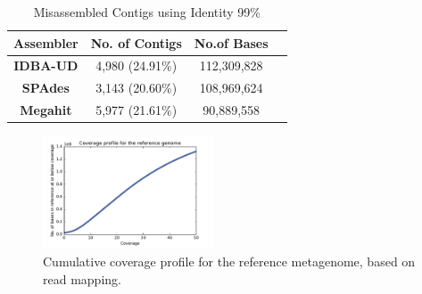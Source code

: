\documentclass[10pt,a4paper,twocolumn]{article}
\begin{document}




\begin{table}[t]
\caption{Misassembled Contigs using Identity 99\%}
\centering
\begin{tabular}{|c|c|c|c|}
\hline

\textbf{Assembler}& \textbf{No. of Contigs} &\textbf{No.of Bases} \\ [0.5ex] %
\hline
\textbf{IDBA-UD}& 4,980 (24.91\%) &112,309,828\\
\hline
\textbf{SPAdes} & 3,143 (20.60\%) &108,969,624 \\
\hline
\textbf{Megahit}& 5,977 (21.61\%) &90,889,558  \\
\hline
\end{tabular}
\label{table:misassembled} 
\end{table}


 
\begin{figure}[!h]
\centering
\includegraphics[width=0.45\textwidth]{CoverageProfile.pdf}  
\caption{\label{fig:coverage-profile} Cumulative coverage profile for the reference metagenome, based on read mapping. }
\end{figure}
\end{document}
